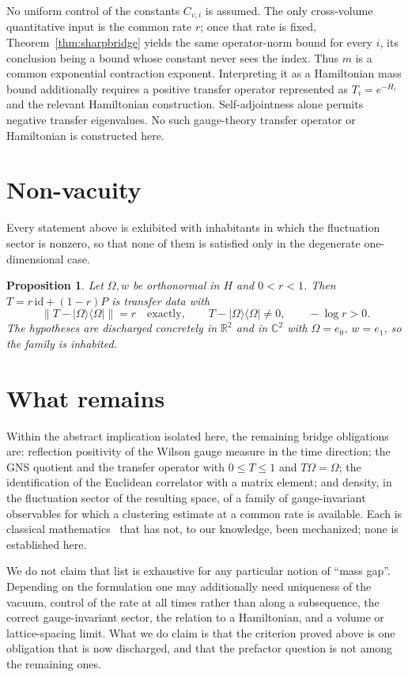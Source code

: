 \documentclass[11pt]{article}
\newtheorem{proposition}[theorem]{Proposition}
\theoremstyle{definition}
\newcommand{\R}{\mathbb{R}}
\newcommand{\C}{\mathbb{C}}
\newcommand{\Om}{\Omega}
\newcommand{\ket}[1]{|#1\rangle}
\newcommand{\bra}[1]{\langle #1|}
\begin{document}
No uniform control of the constants $C_{v,i}$ is assumed.  The only
cross-volume quantitative input is the common rate $r$; once that rate is
fixed, Theorem~\ref{thm:sharpbridge} yields the same operator-norm bound
for every $i$, its conclusion being a bound whose constant never sees the
index.  Thus $m$ is a common exponential contraction exponent.
Interpreting it as a Hamiltonian mass bound additionally requires a
positive transfer operator represented as $T_i=e^{-H_i}$ and the relevant
Hamiltonian construction.  Self-adjointness alone permits negative
transfer eigenvalues.  No such gauge-theory transfer operator or
Hamiltonian is constructed here.

\section{Non-vacuity}

Every statement above is exhibited with inhabitants in which the
fluctuation sector is nonzero, so that none of them is satisfied only in
the degenerate one-dimensional case.

\begin{proposition}
\label{prop:nonvac}
Let $\Om, w$ be orthonormal in $H$ and $0 < r < 1$.  Then
$T = r\,\mathrm{id} + (1-r)P$ is transfer data with
\[
  \|T - \ket{\Om}\bra{\Om}\| = r \quad\text{exactly},\qquad
  T - \ket{\Om}\bra{\Om} \neq 0,\qquad -\log r > 0 .
\]
The hypotheses are discharged concretely in $\R^2$ and in $\C^2$ with
$\Om = e_0$, $w = e_1$, so the family is inhabited.
\end{proposition}

\section{What remains}

Within the abstract implication isolated here, the remaining bridge
obligations are: reflection positivity of the Wilson gauge measure in the
time direction; the GNS quotient and the transfer operator with
$0 \le T \le 1$ and $T\Om = \Om$; the identification of the Euclidean
correlator with a matrix element; and density, in the fluctuation sector
of the resulting space, of a family of gauge-invariant observables for
which a clustering estimate at a common rate is available.  Each is
classical mathematics~\cite{OsterwalderSeiler,GlimmJaffe} that has not, to
our knowledge, been mechanized; none is established here.

We do not claim that list is exhaustive for any particular notion of
``mass gap''.  Depending on the formulation one may additionally need
uniqueness of the vacuum, control of the rate at all times rather than
along a subsequence, the correct gauge-invariant sector, the relation to
a Hamiltonian, and a volume or lattice-spacing limit.  What we do claim
is that the criterion proved above is one obligation that is now
discharged, and that the prefactor question is not among the remaining
ones.
\end{document}
